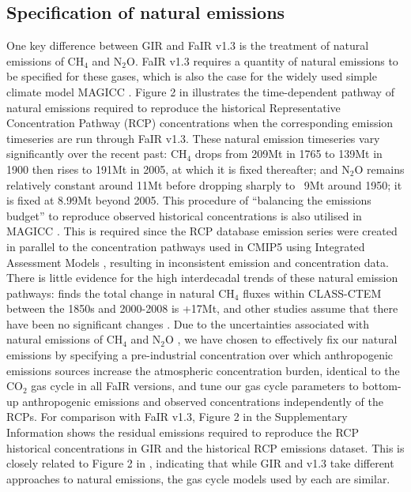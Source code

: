 \documentclass[gmd, manuscript]{copernicus}
\begin{document}
\subsection*{Specification of natural emissions}
One key difference between GIR and FaIR v1.3 is the treatment of natural emissions of CH$_4$ and N$_2$O. FaIR v1.3 requires a quantity of natural emissions to be specified for these gases, which is also the case for the widely used simple climate model MAGICC \citep{Meinshausen2011}. Figure 2 in \cite{Smith2017} illustrates the time-dependent pathway of natural emissions required to reproduce the historical Representative Concentration Pathway (RCP) concentrations when the corresponding emission timeseries \citep{Meinshausen2011c} are run through FaIR v1.3. These natural emission timeseries vary significantly over the recent past: CH$_4$ drops from 209Mt in 1765 to 139Mt in 1900 then rises to 191Mt in 2005, at which it is fixed thereafter; and N$_2$O remains relatively constant around 11Mt before dropping sharply to ~9Mt around 1950; it is fixed at 8.99Mt beyond 2005. This procedure of ``balancing the emissions budget'' to reproduce observed historical concentrations is also utilised in MAGICC \citep{Meinshausen2011}. This is required since the RCP database emission series were created in parallel to the concentration pathways used in CMIP5 using Integrated Assessment Models \citep{Moss2010}, resulting in inconsistent emission and concentration data. There is little evidence for the high interdecadal trends of these natural emission pathways: \cite{Arora2018} finds the total change in natural CH$_4$ fluxes within CLASS-CTEM between the 1850s and 2000-2008 is +17Mt, and other studies assume that there have been no significant changes \citep{Holmes2013,Prather2012}. Due to the uncertainties associated with natural emissions of CH$_4$ and N$_2$O \citep{Turner2019,Davidson2014}, we have chosen to effectively fix our natural emissions by specifying a pre-industrial concentration over which anthropogenic emissions sources increase the atmospheric concentration burden, identical to the CO$_2$ gas cycle in all FaIR versions, and tune our gas cycle parameters to bottom-up anthropogenic emissions \citep{Gutschow2016,Quere2018} and observed concentrations \citep{Meinshausen2017} independently of the RCPs. For comparison with FaIR v1.3, Figure 2 in the Supplementary Information shows the residual emissions required to reproduce the RCP historical concentrations in GIR and the historical RCP emissions dataset. This is closely related to Figure 2 in \cite{Smith2017}, indicating that while GIR and v1.3 take different approaches to natural emissions, the gas cycle models used by each are similar.
\end{document}
